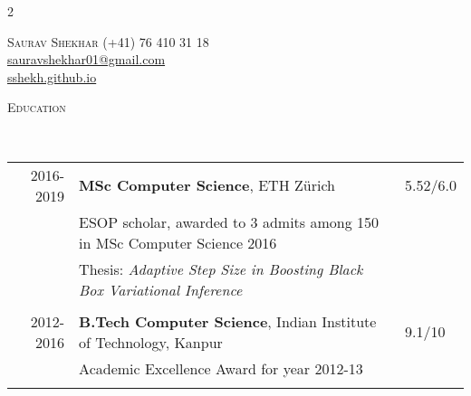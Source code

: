 \documentclass[9pt]{article}
\renewcommand{\arraystretch}{1.5}
\newenvironment{changemargin}[2]{%
  \begin{list}{}{%
      \setlength{\topsep}{0pt}%
    \setlength{\leftmargin}{#1}%
    \setlength{\rightmargin}{#2}%
    \setlength{\listparindent}{\parindent}%
  \setlength{\itemindent}{\parindent}%
    \setlength{\parsep}{\parskip}%
    }%
  \item[]}{\end{list}
    }
\newcommand{\lineover}{
  \begin{changemargin}{-0.05in}{-0.10in}
    \vspace*{-9pt}
    \hrulefill \\
    \vspace*{-2pt}
  \end{changemargin}
}
\newcommand{\header}[1]{
  \begin{changemargin}{-0.5in}{-0.5in}
    \scshape{#1}\\
        \lineover
  \end{changemargin}
}
\newcommand{\name}[1]{
  {\LARGE \scshape {#1}}
}
\newcommand{\contact}[4]{
  \begin{changemargin}{-0.65in}{-0.65in}
    \begin{multicols}{2}
      \name{{#1}}\vfill\null %
                        \columnbreak
                        {#2}\\	
                        {#3}\\ 
                        {#4}\\ 
    \end{multicols}
  \end{changemargin}
}
\begin{document}
\contact{Saurav Shekhar}
{{\hspace{172pt}}(+41) 76 410 31 18}
{{\hspace{130pt}} \href{mailto:sauravshekhar01@gmail.com}{sauravshekhar01@gmail.com}}
{{\hspace{180pt}} \href{https://sshekh.github.io/}{sshekh.github.io}}  

\header{Education}

\vspace{4pt}
        \renewcommand{\arraystretch}{1}
        \begin{tabular}{rll}
          2016-2019 & \textbf{MSc Computer Science},  ETH Z{\"u}rich  & 5.52/6.0 \\
                  & ESOP scholar, awarded to 3 admits among 150 in MSc Computer Science 2016 &\\
                  & Thesis: \emph{Adaptive Step Size in Boosting Black Box Variational Inference} &\\\\
          2012-2016 & \textbf{B.Tech Computer Science},  Indian Institute of Technology, Kanpur & 9.1/10 \\ 
                  &  Academic Excellence Award for year 2012-13 & \\\\
        \end{tabular}

\end{document}
